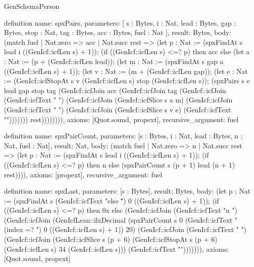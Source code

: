 \begin{lexlean}{GenSchemaPerson}
\begin{semanticmodule}
definition{
  name: spxPairs,
  parameters: [
    s : Bytes,
    i : Nat,
    lead : Bytes,
    gap : Bytes,
    stop : Nat,
    tag : Bytes,
    acc : Bytes,
    fuel : Nat
  ],
  result: Bytes,
  body: (match fuel
    | Nat.zero => acc
    | Nat.succ rest => (let p : Nat := (spxFindAt s lead i ((GenIcf::icfLen s) + 1)); (if ((GenIcf::icfLen s) <=? p) then acc else (let a : Nat := (p + (GenIcf::icfLen lead)); (let m : Nat := (spxFindAt s gap a ((GenIcf::icfLen s) + 1)); (let v : Nat := (m + (GenIcf::icfLen gap)); (let e : Nat := (GenIcf::icfStopAt s v (GenIcf::icfLen s) stop (GenIcf::icfLen s)); (spxPairs s e lead gap stop tag (GenIcf::icfJoin acc (GenIcf::icfJoin tag (GenIcf::icfJoin (GenIcf::icfText " ") (GenIcf::icfJoin (GenIcf::icfSlice s a m) (GenIcf::icfJoin (GenIcf::icfText " ") (GenIcf::icfJoin (GenIcf::icfSlice s v e) (GenIcf::icfText "\n"))))))) rest)))))))),
  axioms: [Quot.sound, propext],
  recursive_argument: fuel
}

definition{
  name: spxPairCount,
  parameters: [s : Bytes, i : Nat, lead : Bytes, n : Nat, fuel : Nat],
  result: Nat,
  body: (match fuel
    | Nat.zero => n
    | Nat.succ rest => (let p : Nat := (spxFindAt s lead i ((GenIcf::icfLen s) + 1)); (if ((GenIcf::icfLen s) <=? p) then n else (spxPairCount s (p + 1) lead (n + 1) rest)))),
  axioms: [propext],
  recursive_argument: fuel
}

definition{
  name: spxLast,
  parameters: [s : Bytes],
  result: Bytes,
  body: (let p : Nat := (spxFindAt s (GenIcf::icfText "else \"") 0 ((GenIcf::icfLen s) + 1)); (if ((GenIcf::icfLen s) <=? p) then 0x else (GenIcf::icfJoin (GenIcf::icfText "n ") (GenIcf::icfJoin (GenIcfLean::ilxDecimal (spxPairCount s 0 (GenIcf::icfText "(index =? ") 0 ((GenIcf::icfLen s) + 1)) 20) (GenIcf::icfJoin (GenIcf::icfText " ") (GenIcf::icfJoin (GenIcf::icfSlice s (p + 6) (GenIcf::icfStopAt s (p + 6) (GenIcf::icfLen s) 34 (GenIcf::icfLen s))) (GenIcf::icfText "\n"))))))),
  axioms: [Quot.sound, propext]
}


\end{semanticmodule}
\end{lexlean}
